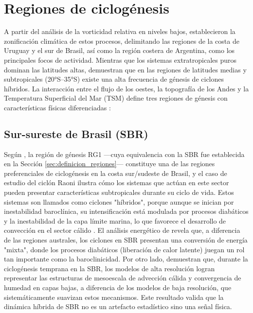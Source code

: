 
\section{Regiones de ciclogénesis}\label{sec:tb_regiones}

A partir del análisis de la vorticidad relativa en niveles bajos, \citet{reboita2010south} establecieron la zonificación climática de estos procesos, delimitando las regiones de la costa de Uruguay y el sur de Brasil, así como la región costera de Argentina, como los principales focos de actividad. Mientras que los sistemas extratropicales puros dominan las latitudes altas, \citet{gozzo2014subtropical} demuestran que en las regiones de latitudes medias y subtropicales (20°S--35°S) existe una alta frecuencia de génesis de ciclones híbridos. La interacción entre el flujo de los oestes, la topografía de los Andes y la Temperatura Superficial del Mar (TSM) define tres regiones de génesis con características físicas diferenciadas \citep{gramcianinov2019properties}: 

\subsection{Sur-sureste de Brasil (SBR)}\label{subsec:tb_sbr}

Según \citet{reboita2022from}, la región de génesis RG1 —cuya equivalencia con la SBR fue establecida en la Sección \ref{sec:definicion_regiones}— constituye una de las regiones preferenciales de ciclogénesis en la costa sur/sudeste de Brasil, y el caso de estudio del ciclón Raoni ilustra cómo los sistemas que actúan en este sector pueden presentar características subtropicales durante su ciclo de vida. Estos sistemas son llamados como ciclones "híbridos", porque aunque se inician por inestabilidad baroclínica, su intensificación está modulada por procesos diabáticos y la inestabilidad de la capa límite marina, lo que favorece el desarrollo de convección en el sector cálido \citep{marrafon2022classificacao}. 
El análisis energético de \citet{coutodesouza2024thesis} revela que, a diferencia de las regiones australes, los ciclones en SBR presentan una conversión de energía "mixta", donde los procesos diabáticos (liberación de calor latente) juegan un rol tan importante como la baroclinicidad. Por otro lado, \citet{gramcianinov2024early} demuestran que, durante la ciclogénesis temprana en la SBR, los modelos de alta resolución logran representar las estructuras de mesoescala de advección cálida y convergencia de humedad en capas bajas, a diferencia de los modelos de baja resolución, que sistemáticamente suavizan estos mecanismos. Este resultado valida que la dinámica híbrida de SBR no es un artefacto estadístico sino una señal física.

